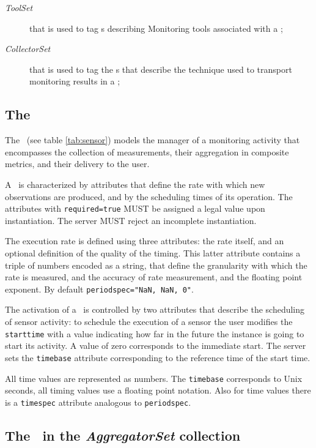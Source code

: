 \documentclass[12pt]{article}  %
\begin{document}
{\begin{description}
\item [{\em ToolSet}] that is used to tag \mi s describing Monitoring tools associated with a \coll;

\item [{\em CollectorSet}] that is used to tag the \mi s that describe the technique used to transport monitoring results in a \coll;

\end{description}



\subsection{The \sens \label{sec:sensor}}



The \sens\ (see table \ref{tab:sensor}) models the manager of a monitoring activity that encompasses the collection of measurements, their aggregation in composite metrics, and their delivery to the user.

A \sens\ is characterized by attributes that define the rate with which new observations are produced, and by the scheduling times of its operation. The attributes with \verb|required=true| MUST be assigned a legal value upon instantiation. The server MUST reject an incomplete instantiation.

The execution rate is defined using three attributes: the rate itself, and an optional definition of the quality of the timing. This latter attribute contains a triple of numbers encoded as a string, that define the granularity with which the rate is measured, and the accuracy of rate measurement, and the floating point exponent. By default \verb|periodspec="NaN, NaN, 0"|.

The activation of a \sens\ is controlled by two attributes that describe the scheduling of sensor activity: to schedule the execution of a sensor the user modifies the {\tt starttime} with a value indicating how far in the future the instance is going to start its activity. A value of zero corresponds to the immediate start. The server sets the {\tt timebase} attribute corresponding to the reference time of the start time.

All time values are represented as numbers. The {\tt timebase} corresponds to Unix seconds, all timing values use a floating point notation. Also for time values there is a {\tt timespec} attribute analogous to {\tt periodspec}.

\subsection{The \mi\ in the {\em AggregatorSet} collection}

}
\end{document}
